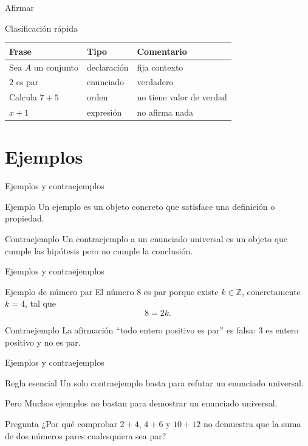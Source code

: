 \documentclass[aspectratio=169,11pt]{beamer}
\newcommand{\Z}{\mathbb{Z}}
\begin{document}
\begin{frame}{Afirmar}
\begin{block}{Clasificación rápida}
\begin{center}
\begin{tabular}{lll}
\toprule
Frase & Tipo & Comentario \\
\midrule
Sea \(A\) un conjunto & declaración & fija contexto \\
\(2\) es par & enunciado & verdadero \\
Calcula \(7+5\) & orden & no tiene valor de verdad \\
\(x+1\) & expresión & no afirma nada \\
\bottomrule
\end{tabular}
\end{center}
\end{block}
\end{frame}

\section{Ejemplos}

\begin{frame}{Ejemplos y contraejemplos}
\begin{block}{Ejemplo}
Un ejemplo es un objeto concreto que satisface una definición o propiedad.
\end{block}

\begin{block}{Contraejemplo}
Un contraejemplo a un enunciado universal es un objeto que cumple las hipótesis
pero no cumple la conclusión.
\end{block}
\end{frame}

\begin{frame}{Ejemplos y contraejemplos}
\begin{block}{Ejemplo de número par}
El número \(8\) es par porque existe \(k\in\Z\), concretamente \(k=4\), tal que
\[
  8=2k.
\]
\end{block}

\begin{block}{Contraejemplo}
La afirmación ``todo entero positivo es par'' es falsa: \(3\) es entero positivo
y no es par.
\end{block}
\end{frame}

\begin{frame}{Ejemplos y contraejemplos}
\begin{alertblock}{Regla esencial}
Un solo contraejemplo basta para refutar un enunciado universal.
\end{alertblock}

\begin{block}{Pero}
Muchos ejemplos no bastan para demostrar un enunciado universal.
\end{block}

\begin{exampleblock}{Pregunta}
¿Por qué comprobar \(2+4\), \(4+6\) y \(10+12\) no demuestra que la suma de dos
números pares cualesquiera sea par?
\end{exampleblock}
\end{frame}
\end{document}
